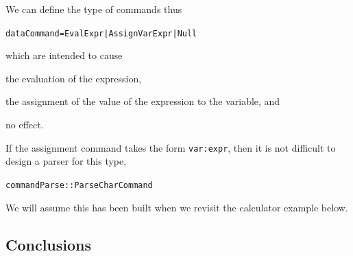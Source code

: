 We can define the type of commands thus
\begin{alltt}
data Command = Eval Expr | Assign Var Expr | Null
\end{alltt}
which are intended to cause 
\begin{titemize}
\item the evaluation of the expression,
\item the assignment of the value of the expression to the variable, and
\item no effect.
\end{titemize}
If the assignment command takes the form \texttt{var:expr}, then it is not
difficult to design a parser for this type,
\begin{alltt}
commandParse :: Parse Char Command
\end{alltt}
We will assume this has been built when we revisit the calculator example
below.


\subsection*{Conclusions}

